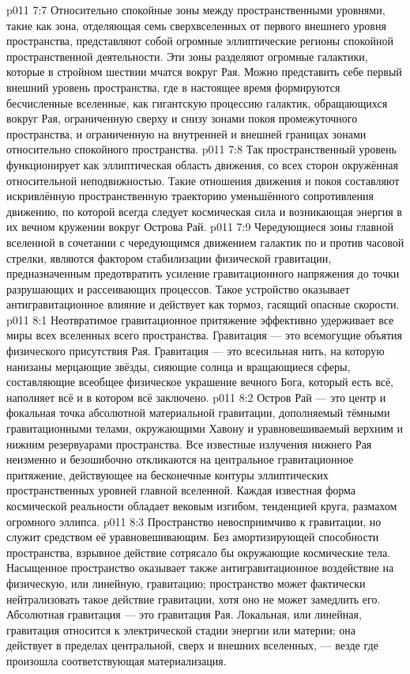 \vs p011 7:7 \pc Относительно спокойные зоны между пространственными уровнями, такие как зона, отделяющая семь сверхвселенных от первого внешнего уровня пространства, представляют собой огромные эллиптические регионы спокойной пространственной деятельности. Эти зоны разделяют огромные галактики, которые в стройном шествии мчатся вокруг Рая. Можно представить себе первый внешний уровень пространства, где в настоящее время формируются бесчисленные вселенные, как гигантскую процессию галактик, обращающихся вокруг Рая, ограниченную сверху и снизу зонами покоя промежуточного пространства, и ограниченную на внутренней и внешней границах зонами относительно спокойного пространства.
\vs p011 7:8 Так пространственный уровень функционирует как эллиптическая область движения, со всех сторон окружённая относительной неподвижностью. Такие отношения движения и покоя составляют искривлённую пространственную траекторию уменьшённого сопротивления движению, по которой всегда следует космическая сила и возникающая энергия в их вечном кружении вокруг Острова Рай.
\vs p011 7:9 Чередующиеся зоны главной вселенной в сочетании с чередующимся движением галактик по и против часовой стрелки, являются фактором стабилизации физической гравитации, предназначенным предотвратить усиление гравитационного напряжения до точки разрушающих и рассеивающих процессов. Такое устройство оказывает антигравитационное влияние и действует как тормоз, гасящий опасные скорости.
\vs p011 8:1 Неотвратимое гравитационное притяжение эффективно удерживает все миры всех вселенных всего пространства. Гравитация --- это всемогущие объятия физического присутствия Рая. Гравитация --- это всесильная нить, на которую нанизаны мерцающие звёзды, сияющие солнца и вращающиеся сферы, составляющие всеобщее физическое украшение вечного Бога, который есть всё, наполняет всё и в котором всё заключено.
\vs p011 8:2 Остров Рай --- это центр и фокальная точка абсолютной материальной гравитации, дополняемый тёмными гравитационными телами, окружающими Хавону и уравновешиваемый верхним и нижним резервуарами пространства. Все известные излучения нижнего Рая неизменно и безошибочно откликаются на центральное гравитационное притяжение, действующее на бесконечные контуры эллиптических пространственных уровней главной вселенной. Каждая известная форма космической реальности обладает вековым изгибом, тенденцией круга, размахом огромного эллипса.
\vs p011 8:3 Пространство невосприимчиво к гравитации, но служит средством её уравновешивающим. Без амортизирующей способности пространства, взрывное действие сотрясало бы окружающие космические тела. Насыщенное пространство оказывает также антигравитационное воздействие на физическую, или линейную, гравитацию; пространство может фактически нейтрализовать такое действие гравитации, хотя оно не может замедлить его. Абсолютная гравитация --- это гравитация Рая. Локальная, или линейная, гравитация относится к электрической стадии энергии или материи; она действует в пределах центральной, сверх и внешних вселенных, --- везде где произошла соответствующая материализация.

